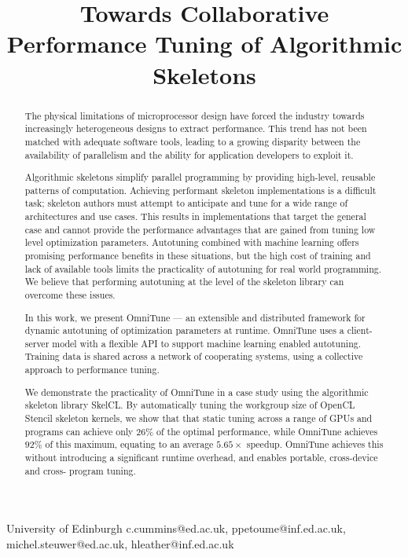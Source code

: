 \documentclass[nonatbib,preprint,nocopyrightspace,9pt]{sigplanconf}
\begin{document}
\setlength{\pdfpageheight}{\paperheight}
\setlength{\pdfpagewidth}{\paperwidth}


\title{Towards Collaborative Performance Tuning of Algorithmic Skeletons}
           {University of Edinburgh}
           {c.cummins@ed.ac.uk, ppetoume@inf.ed.ac.uk, michel.steuwer@ed.ac.uk, hleather@inf.ed.ac.uk}

\maketitle

\begin{abstract}
  The physical limitations of microprocessor design have forced the industry
  towards increasingly heterogeneous designs to extract performance. This trend
  has not been matched with adequate software tools, leading to a growing
  disparity between the availability of parallelism and the ability for
  application developers to exploit it.

  Algorithmic skeletons simplify parallel programming by providing high-level,
  reusable patterns of computation. Achieving performant skeleton
  implementations is a difficult task; skeleton authors must attempt to
  anticipate and tune for a wide range of architectures and use cases. This
  results in implementations that target the general case and cannot provide the
  performance advantages that are gained from tuning low level optimization
  parameters. Autotuning combined with machine learning offers promising
  performance benefits in these situations, but the high cost of training and
  lack of available tools limits the practicality of autotuning for real world
  programming. We believe that performing autotuning at the level of the
  skeleton library can overcome these issues.

  In this work, we present OmniTune --- an extensible and distributed framework
  for dynamic autotuning of optimization parameters at runtime. OmniTune uses a
  client-server model with a flexible API to support machine learning enabled
  autotuning. Training data is shared across a network of cooperating systems,
  using a collective approach to performance tuning.

  We demonstrate the practicality of OmniTune in a case study using the
  algorithmic skeleton library SkelCL. By automatically tuning the workgroup
  size of OpenCL Stencil skeleton kernels, we show that that static tuning
  across a range of GPUs and programs can achieve only $26\%$ of the optimal
  performance, while OmniTune achieves $92\%$ of this maximum, equating to an
  average $5.65\times$ speedup. OmniTune achieves this without introducing a
  significant runtime overhead, and enables portable, cross-device and cross-
  program tuning.
\end{abstract}
\end{document}
